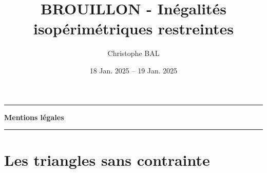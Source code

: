 \documentclass[12pt]{amsart}
\begin{document}
\title{BROUILLON - Inégalités isopérimétriques restreintes}
\author{Christophe BAL}
\date{18 Jan. 2025 -- 19 Jan. 2025}
\maketitle


\begin{center}
	\hrule\vspace{.3em}
	{
		\fontsize{1.35em}{1em}\selectfont
		\textbf{Mentions \og légales \fg}
	}
			
	\vspace{0.45em}
	\doclicenseThis
	\hrule
\end{center}



\setcounter{tocdepth}{2}
\tableofcontents




\newpage
%
%
%
%
%
%
%
%
%
%
%
%
%
%
%

%
%
\section{Les triangles sans contrainte}


%
%
%
%
%
%
\end{document}
